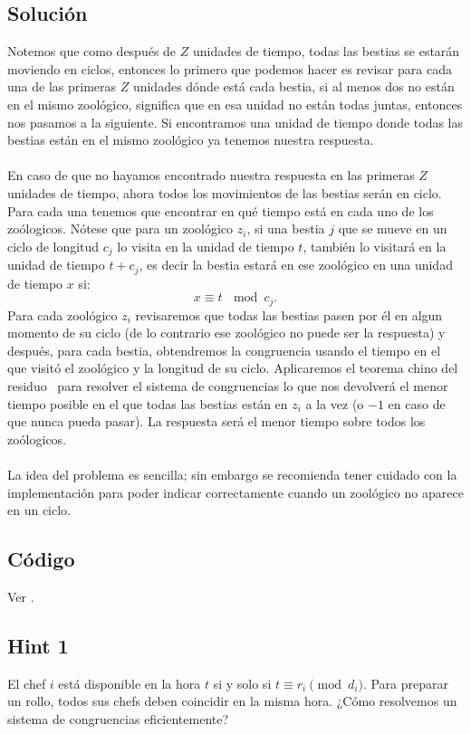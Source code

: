 \subsection*{Solución}
Notemos que como después de $Z$ unidades de tiempo, todas las bestias se estarán moviendo en ciclos, entonces lo primero que podemos hacer es revisar para cada una de las primeras $Z$ unidades dónde está cada bestia, si al menos dos no están en el mismo zoológico, significa que en esa unidad no están todas juntas, entonces nos pasamos a la siguiente. Si encontramos una unidad de tiempo donde todas las bestias están en el mismo zoológico ya tenemos nuestra respuesta.
\\\\
En caso de que no hayamos encontrado nuestra respuesta en las primeras $Z$ unidades de tiempo, ahora todos los movimientos de las bestias serán en ciclo. Para cada una tenemos que encontrar en qué tiempo está en cada uno de los zoólogicos. Nótese que para un zoológico $z_i$, si una bestia $j$ que se mueve en un ciclo de longitud $c_j$ lo visita en la unidad de tiempo $t$, también lo visitará en la unidad de tiempo $t+c_j$, es decir la bestia estará en ese zoológico en una unidad de tiempo $x$ si:
\[x \equiv t \, \mod c_j.\]
Para cada zoológico $z_i$ revisaremos que todas las bestias pasen por él en algun momento de su ciclo (de lo contrario ese zoológico no puede ser la respuesta) y después, para cada bestia, obtendremos la congruencia usando el tiempo en el que visitó el zoológico y la longitud de su ciclo. Aplicaremos el teorema chino del residuo~\cite{cf_crt} para resolver el sistema de congruencias lo que nos devolverá el menor tiempo posible en el que todas las bestias están en $z_i$ a la vez (o $-1$ en caso de que nunca pueda pasar). La respuesta será el menor tiempo sobre todos los zoólogicos.
\\\\
La idea del problema es sencilla; sin embargo se recomienda tener cuidado con la implementación para poder indicar correctamente cuando un zoológico no aparece en un ciclo.
\subsection*{Código}
Ver .

\subsection*{Hint 1}
El chef $i$ está disponible en la hora $t$ si y solo si
$t \equiv r_i \pmod{d_i}$. Para preparar un rollo, todos sus
chefs deben coincidir en la misma hora. ¿Cómo resolvemos un sistema de congruencias eficientemente?
